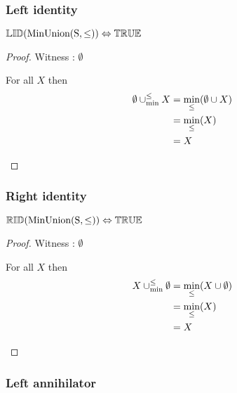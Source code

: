 \documentclass[../Summary.tex]{subfiles}
\begin{document}
\subsubsection{Left identity}

\begin{theorem} \label{thm:minunion_lid}
${\mathbb{LID}}(\mathrm{MinUnion(S,\leq)}) \Leftrightarrow {\mathbb{TRUE}}$
\end{theorem}

\begin{proof}

\vspace{0.5em}

Witness : $\emptyset$
\begin{ind}
For all $X$ then
\begin{align*}
\emptyset \mathbin{\cup_{\min}^{\leq}} X 	& = \min_\leq(\emptyset \cup X) \\
						& = \min_\leq(X) \\
						& = X
\end{align*}
\end{ind}
\end{proof}



\subsubsection{Right identity}

\begin{theorem} \label{thm:minunion_rid}
${\mathbb{RID}}(\mathrm{MinUnion(S,\leq)}) \Leftrightarrow {\mathbb{TRUE}}$
\end{theorem}

\begin{proof}

\vspace{0.5em}

Witness : $\emptyset$
\begin{ind}
For all $X$ then
\begin{align*}
X \mathbin{\cup_{\min}^{\leq}} \emptyset 	& = \min_\leq(X \cup \emptyset) \\
						& = \min_\leq(X) \\
						& = X
\end{align*}
\end{ind}
\end{proof}





\subsubsection{Left annihilator}
\end{document}
